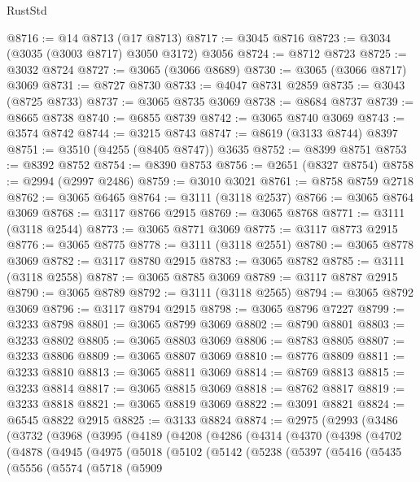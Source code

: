 \begin{lexlean}{RustStd}
\begin{coremodule}
@8716 := @14 @8713 (@17 @8713)
@8717 := @3045 @8716
@8723 := @3034 (@3035 (@3003 @8717) @3050 @3172) @3056
@8724 := @8712 @8723
@8725 := @3032 @8724
@8727 := @3065 (@3066 @8689)
@8730 := @3065 (@3066 @8717) @3069
@8731 := @8727 @8730
@8733 := @4047 @8731 @2859
@8735 := @3043 (@8725 @8733)
@8737 := @3065 @8735 @3069
@8738 := @8684 @8737
@8739 := @8665 @8738
@8740 := @6855 @8739
@8742 := @3065 @8740 @3069
@8743 := @3574 @8742
@8744 := @3215 @8743
@8747 := @8619 (@3133 @8744) @8397
@8751 := @3510 (@4255 (@8405 @8747)) @3635
@8752 := @8399 @8751
@8753 := @8392 @8752
@8754 := @8390 @8753
@8756 := @2651 (@8327 @8754)
@8758 := @2994 (@2997 @2486)
@8759 := @3010 @3021
@8761 := @8758 @8759 @2718
@8762 := @3065 @6465
@8764 := @3111 (@3118 @2537)
@8766 := @3065 @8764 @3069
@8768 := @3117 @8766 @2915
@8769 := @3065 @8768
@8771 := @3111 (@3118 @2544)
@8773 := @3065 @8771 @3069
@8775 := @3117 @8773 @2915
@8776 := @3065 @8775
@8778 := @3111 (@3118 @2551)
@8780 := @3065 @8778 @3069
@8782 := @3117 @8780 @2915
@8783 := @3065 @8782
@8785 := @3111 (@3118 @2558)
@8787 := @3065 @8785 @3069
@8789 := @3117 @8787 @2915
@8790 := @3065 @8789
@8792 := @3111 (@3118 @2565)
@8794 := @3065 @8792 @3069
@8796 := @3117 @8794 @2915
@8798 := @3065 @8796 @7227
@8799 := @3233 @8798
@8801 := @3065 @8799 @3069
@8802 := @8790 @8801
@8803 := @3233 @8802
@8805 := @3065 @8803 @3069
@8806 := @8783 @8805
@8807 := @3233 @8806
@8809 := @3065 @8807 @3069
@8810 := @8776 @8809
@8811 := @3233 @8810
@8813 := @3065 @8811 @3069
@8814 := @8769 @8813
@8815 := @3233 @8814
@8817 := @3065 @8815 @3069
@8818 := @8762 @8817
@8819 := @3233 @8818
@8821 := @3065 @8819 @3069
@8822 := @3091 @8821
@8824 := @6545 @8822 @2915
@8825 := @3133 @8824
@8874 := @2975
    (@2993
      (@3486
        (@3732
          (@3968
            (@3995
              (@4189
                (@4208
                  (@4286
                    (@4314
                      (@4370
                        (@4398
                          (@4702
                            (@4878
                              (@4945
                                (@4975
                                  (@5018
                                    (@5102
                                      (@5142
                                        (@5238
                                          (@5397
                                            (@5416
                                              (@5435
                                                (@5556
                                                  (@5574
                                                    (@5718
                                                      (@5909

\end{coremodule}
\end{lexlean}
